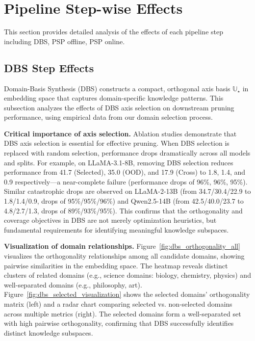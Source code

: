 \endgroup



\clearpage
{}

\section{Pipeline Step-wise Effects}
\label{app:pipeline_effects}

This section provides detailed analysis of the effects of each pipeline step including DBS, PSP offline, PSP online.

\subsection{DBS Step Effects}
\label{app:pipeline_effects_dbs}

Domain-Basis Synthesis (DBS) constructs a compact, orthogonal axis basis $\mathbb{U}_\star$ in embedding space that captures domain-specific knowledge patterns.
This subsection analyzes the effects of DBS axis selection on downstream pruning performance, using empirical data from our domain selection process.

\textbf{Critical importance of axis selection.}
Ablation studies demonstrate that DBS axis selection is essential for effective pruning.
When DBS selection is replaced with random selection, performance drops dramatically across all models and splits.
For example, on LLaMA-3.1-8B, removing DBS selection reduces performance from 41.7 (Selected), 35.0 (OOD), and 17.9 (Cross) to 1.8, 1.4, and 0.9 respectively---a near-complete failure (performance drops of 96\%, 96\%, 95\%).
Similar catastrophic drops are observed on LLaMA-2-13B (from 34.7/30.4/22.9 to 1.8/1.4/0.9, drops of 95\%/95\%/96\%) and Qwen2.5-14B (from 42.5/40.0/23.7 to 4.8/2.7/1.3, drops of 89\%/93\%/95\%).
This confirms that the orthogonality and coverage objectives in DBS are not merely optimization heuristics, but fundamental requirements for identifying meaningful knowledge subspaces.

\textbf{Visualization of domain relationships.}
Figure~\ref{fig:dbs_orthogonality_all} visualizes the orthogonality relationships among all candidate domains, showing pairwise similarities in the embedding space.
The heatmap reveals distinct clusters of related domains (e.g., science domains: biology, chemistry, physics) and well-separated domains (e.g., philosophy, art).
Figure~\ref{fig:dbs_selected_visualization} shows the selected domains' orthogonality matrix (left) and a radar chart comparing selected vs. non-selected domains across multiple metrics (right).
The selected domains form a well-separated set with high pairwise orthogonality, confirming that DBS successfully identifies distinct knowledge subspaces.

